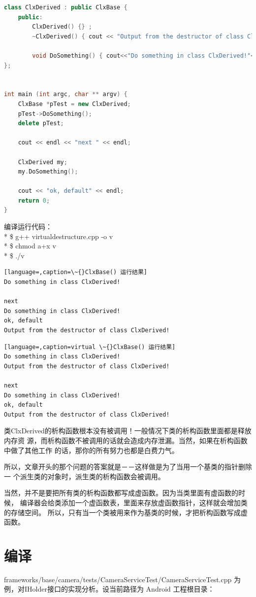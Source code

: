 \documentclass[a4paper,11pt]{article}
\begin{document}
\begin{appendices}
\begin{lstlisting}[language=c++, caption=VirtualDestructor.cpp]
class ClxDerived : public ClxBase {
    public:
        ClxDerived() {} ;
        ~ClxDerived() { cout << "Output from the destructor of class ClxDerived!" << endl; } ;

        void DoSomething() { cout<<"Do something in class ClxDerived!"<<endl;};
};


int main (int argc, char ** argv) {
    ClxBase *pTest = new ClxDerived;
    pTest->DoSomething();
    delete pTest;

    cout << endl << "next " << endl;

    ClxDerived my;
    my.DoSomething(); 

    cout << "ok, default" << endl;
    return 0;
}
\end{lstlisting}

编译运行代码：\\*
\$ g++ virtualdestructure.cpp -o v\\*
\$ chmod a+x v\\*
\$ ./v

\begin{lstlisting}[language=,caption=\~{}ClxBase() 运行结果]
Do something in class ClxDerived!

next 
Do something in class ClxDerived!
ok, default
Output from the destructor of class ClxDerived!
\end{lstlisting}

\begin{lstlisting}[language=,caption=virtual \~{}ClxBase() 运行结果]
Do something in class ClxDerived!
Output from the destructor of class ClxDerived!

next 
Do something in class ClxDerived!
ok, default
Output from the destructor of class ClxDerived!
\end{lstlisting}

类ClxDerived的析构函数根本没有被调用！一般情况下类的析构函数里面都是释放内存资
源，而析构函数不被调用的话就会造成内存泄漏。当然，如果在析构函数中做了其他工作
的话，那你的所有努力也都是白费力气。

所以，文章开头的那个问题的答案就是－－这样做是为了当用一个基类的指针删除一
个派生类的对象时，派生类的析构函数会被调用。

当然，并不是要把所有类的析构函数都写成虚函数。因为当类里面有虚函数的时候，
编译器会给类添加一个虚函数表，里面来存放虚函数指针，这样就会增加类的存储空间。
所以，只有当一个类被用来作为基类的时候，才把析构函数写成虚函数。

\iffalse
\section{编译}\label{compile}
frameworks/base/camera/tests/CameraServiceTest/CameraServiceTest.cpp
为例，对IHolder接口的实现分析。设当前路径为 Android 工程根目录：


\end{appendices}
\end{document}
